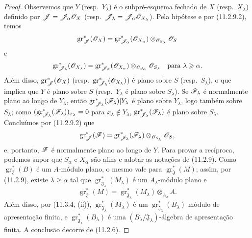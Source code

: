 \begin{proof}
Observemos que $Y$ (resp.\ $Y_\lambda$) é o subpré-esquema
fechado de $X$ (resp.\ $X_\lambda$) definido por
$\mathscr J=\mathscr J_\alpha\mathscr{O}_X$
(resp.\ $\mathscr J_\lambda
=\mathscr J_\alpha\mathscr{O}_{X_\lambda}$).
Pela hipótese e por (11.2.9.2), temos
\[
\operatorname{gr}_{\mathscr J}^*(\mathscr{O}_X)
=\operatorname{gr}_{\mathscr J_\alpha}^*
(\mathscr{O}_{X_\alpha})
\otimes_{\mathscr{O}_{S_\alpha}}\mathscr{O}_S
\]
e
\[
\operatorname{gr}_{\mathscr J_\lambda}^*(\mathscr{O}_{X_\lambda})
=\operatorname{gr}_{\mathscr J_\alpha}^*
(\mathscr{O}_{X_\alpha})
\otimes_{\mathscr{O}_{S_\alpha}}\mathscr{O}_{S_\lambda}
\quad\text{para }\lambda\geqslant\alpha.
\]
Além disso, $\operatorname{gr}_{\mathscr J}^*(\mathscr{O}_X)$
(resp.\ $\operatorname{gr}_{\mathscr J_\lambda}^*
(\mathscr{O}_{X_\lambda})$) é plano sobre $S$
(resp.\ $S_\lambda$), o que implica que $Y$ é plano
sobre $S$ (resp.\ $Y_\lambda$ é plano sobre $S_\lambda$).
Se $\mathscr{F}_\lambda$ é normalmente plano ao longo de
$Y_\lambda$, então
$\operatorname{gr}_{\mathscr J_\lambda}^*
(\mathscr{F}_\lambda)|Y_\lambda$ é plano sobre $Y_\lambda$,
logo também sobre $S_\lambda$; como
$(\operatorname{gr}_{\mathscr J_\lambda}^*
(\mathscr{F}_\lambda))_{x_\lambda}=0$ para
$x_\lambda\notin Y_\lambda$,
$\operatorname{gr}_{\mathscr J_\lambda}^*
(\mathscr{F}_\lambda)$ é plano sobre $S_\lambda$.
Concluímos por (11.2.9.2) que
\[
\operatorname{gr}_{\mathscr J}^*(\mathscr{F})
=\operatorname{gr}_{\mathscr J_\lambda}^*(\mathscr{F}_\lambda)
\otimes_{\mathscr{O}_{S_\lambda}}\mathscr{O}_S,
\]
e, portanto, $\mathscr{F}$ é normalmente plano ao longo de $Y$.
Para provar a recíproca, podemos supor que $S_\alpha$ e
$X_\alpha$ são afins e adotar as notações de (11.2.9).
Como $\operatorname{gr}_{\mathfrak J}^*(B)$ é um
$A$-módulo plano, o mesmo vale para
$\operatorname{gr}_{\mathfrak J}^*(M)$; assim, por (11.2.9),
existe $\lambda\geq\alpha$ tal que
$\operatorname{gr}_{\mathfrak J_\lambda}^*(M_\lambda)$
é um $A_\lambda$-módulo plano e
\[
\operatorname{gr}_{\mathfrak J}^*(M)
=\operatorname{gr}_{\mathfrak J_\lambda}^*(M_\lambda)
\otimes_{A_\lambda}A.
\]
Além disso, por (11.3.4, (ii)),
$\operatorname{gr}_{\mathfrak J_\lambda}^*(M_\lambda)$
é um $\operatorname{gr}_{\mathfrak J_\lambda}^*
(B_\lambda)$-módulo de apresentação finita, e
$\operatorname{gr}_{\mathfrak J_\lambda}^*(B_\lambda)$
é uma $(B_\lambda/\mathfrak J_\lambda)$-álgebra
de apresentação finita. A conclusão decorre de (11.2.6).
\end{proof}


